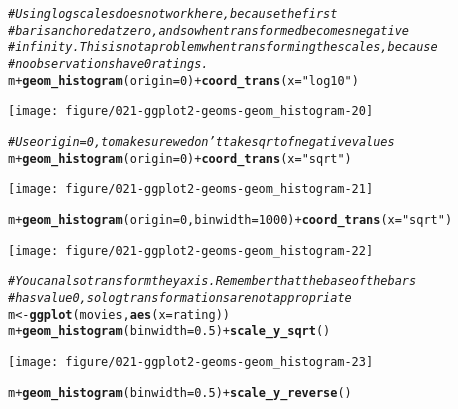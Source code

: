 \documentclass[a4paper,titlepage]{tufte-handout}\usepackage[]{graphicx}\usepackage[]{color}
\makeatletter
\def\maxwidth{ %
  \ifdim\Gin@nat@width>\linewidth
    \linewidth
  \else
    \Gin@nat@width
  \fi
}
\newcommand{\hlnum}[1]{\textcolor[rgb]{0.686,0.059,0.569}{#1}}%
\newcommand{\hlstr}[1]{\textcolor[rgb]{0.192,0.494,0.8}{#1}}%
\newcommand{\hlcom}[1]{\textcolor[rgb]{0.678,0.584,0.686}{\textit{#1}}}%
\newcommand{\hlopt}[1]{\textcolor[rgb]{0,0,0}{#1}}%
\newcommand{\hlstd}[1]{\textcolor[rgb]{0.345,0.345,0.345}{#1}}%
\newcommand{\hlkwb}[1]{\textcolor[rgb]{0.69,0.353,0.396}{#1}}%
\newcommand{\hlkwc}[1]{\textcolor[rgb]{0.333,0.667,0.333}{#1}}%
\newcommand{\hlkwd}[1]{\textcolor[rgb]{0.737,0.353,0.396}{\textbf{#1}}}%
\newenvironment{kframe}{%
 \def\at@end@of@kframe{}%
 \ifinner\ifhmode%
  \def\at@end@of@kframe{\end{minipage}}%
  \begin{minipage}{\columnwidth}%
 \fi\fi%
 \def\FrameCommand##1{\hskip\@totalleftmargin \hskip-\fboxsep
 \colorbox{shadecolor}{##1}\hskip-\fboxsep
     \hskip-\linewidth \hskip-\@totalleftmargin \hskip\columnwidth}%
 \MakeFramed {\advance\hsize-\width
   \@totalleftmargin\z@ \linewidth\hsize
   \@setminipage}}%
 {\par\unskip\endMakeFramed%
 \at@end@of@kframe}
\newenvironment{knitrout}{}{} %
\makeatother
\begin{document}
\begin{knitrout}
\begin{kframe}
\begin{alltt}
\hlcom{# Using log scales does not work here, because the first}
\hlcom{# bar is anchored at zero, and so when transformed becomes negative}
\hlcom{# infinity.  This is not a problem when transforming the scales, because}
\hlcom{# no observations have 0 ratings.}
\hlstd{m} \hlopt{+} \hlkwd{geom_histogram}\hlstd{(}\hlkwc{origin} \hlstd{=} \hlnum{0}\hlstd{)} \hlopt{+} \hlkwd{coord_trans}\hlstd{(}\hlkwc{x} \hlstd{=} \hlstr{"log10"}\hlstd{)}
\end{alltt}
\end{kframe}
\texttt{[image: figure/021-ggplot2-geoms-geom\_histogram-20]} 
\begin{kframe}\begin{alltt}
\hlcom{# Use origin = 0, to make sure we don't take sqrt of negative values}
\hlstd{m} \hlopt{+} \hlkwd{geom_histogram}\hlstd{(}\hlkwc{origin} \hlstd{=} \hlnum{0}\hlstd{)} \hlopt{+} \hlkwd{coord_trans}\hlstd{(}\hlkwc{x} \hlstd{=} \hlstr{"sqrt"}\hlstd{)}
\end{alltt}
\end{kframe}
\texttt{[image: figure/021-ggplot2-geoms-geom\_histogram-21]} 
\begin{kframe}\begin{alltt}
\hlstd{m} \hlopt{+} \hlkwd{geom_histogram}\hlstd{(}\hlkwc{origin} \hlstd{=} \hlnum{0}\hlstd{,} \hlkwc{binwidth} \hlstd{=} \hlnum{1000}\hlstd{)} \hlopt{+} \hlkwd{coord_trans}\hlstd{(}\hlkwc{x} \hlstd{=} \hlstr{"sqrt"}\hlstd{)}
\end{alltt}
\end{kframe}
\texttt{[image: figure/021-ggplot2-geoms-geom\_histogram-22]} 
\begin{kframe}\begin{alltt}
\hlcom{# You can also transform the y axis.  Remember that the base of the bars}
\hlcom{# has value 0, so log transformations are not appropriate}
\hlstd{m} \hlkwb{<-} \hlkwd{ggplot}\hlstd{(movies,} \hlkwd{aes}\hlstd{(}\hlkwc{x} \hlstd{= rating))}
\hlstd{m} \hlopt{+} \hlkwd{geom_histogram}\hlstd{(}\hlkwc{binwidth} \hlstd{=} \hlnum{0.5}\hlstd{)} \hlopt{+} \hlkwd{scale_y_sqrt}\hlstd{()}
\end{alltt}
\end{kframe}
\texttt{[image: figure/021-ggplot2-geoms-geom\_histogram-23]} 
\begin{kframe}\begin{alltt}
\hlstd{m} \hlopt{+} \hlkwd{geom_histogram}\hlstd{(}\hlkwc{binwidth} \hlstd{=} \hlnum{0.5}\hlstd{)} \hlopt{+} \hlkwd{scale_y_reverse}\hlstd{()}
\end{alltt}



\end{kframe}
\end{knitrout}
\end{document}
